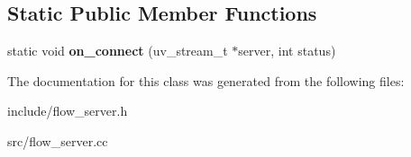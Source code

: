 \subsection*{Static Public Member Functions}
\begin{DoxyCompactItemize}
\item 
static void {\bfseries on\+\_\+connect} (uv\+\_\+stream\+\_\+t $\ast$server, int status)\hypertarget{classflow_1_1_flow_server_a4145cb20862c2f798339752763aaf0ad}{}\label{classflow_1_1_flow_server_a4145cb20862c2f798339752763aaf0ad}

\end{DoxyCompactItemize}


The documentation for this class was generated from the following files\+:\begin{DoxyCompactItemize}
\item 
include/flow\+\_\+server.\+h\item 
src/flow\+\_\+server.\+cc\end{DoxyCompactItemize}
